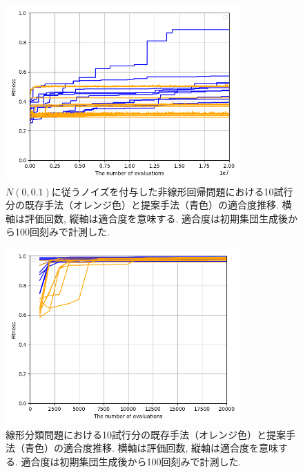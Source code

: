 \documentclass[11pt,oneside,openany,report]{jsbook}
\begin{document}
\begin{figure}[H]
  \centering
  \includegraphics[width=9cm]{exp/noisy_two_layers_nn_regression.png}
  \caption{$N(0,0.1)$に従うノイズを付与した非線形回帰問題における10試行分の既存手法（オレンジ色）と提案手法（青色）の適合度推移. 横軸は評価回数, 縦軸は適合度を意味する. 適合度は初期集団生成後から100回刻みで計測した.}
  \label{fig:exp:result:noisy_two_layers_nn_regression}
\end{figure}

\begin{figure}[H]
  \centering
  \includegraphics[width=9cm]{exp/linear_classification.png}
  \caption{線形分類問題における10試行分の既存手法（オレンジ色）と提案手法（青色）の適合度推移. 横軸は評価回数, 縦軸は適合度を意味する. 適合度は初期集団生成後から100回刻みで計測した.}
  \label{fig:exp:result:linear_classification}
\end{figure}
\end{document}
